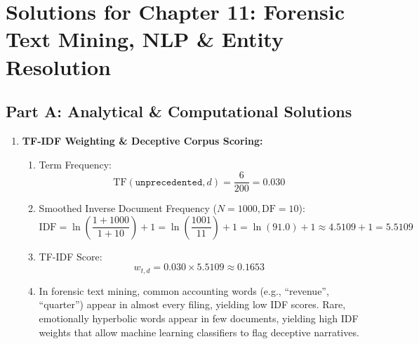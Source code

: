 \section*{Solutions for Chapter 11: Forensic Text Mining, NLP \& Entity Resolution}

\subsection*{Part A: Analytical \& Computational Solutions}

\begin{enumerate}[label=\textbf{P11.\arabic*}]
    \item \textbf{TF-IDF Weighting \& Deceptive Corpus Scoring:}
    \begin{enumerate}[label=(\alph*)]
        \item Term Frequency:
        \begin{equation*}
        \text{TF}(\texttt{unprecedented}, d) = \frac{6}{200} = \mathbf{0.030}
        \end{equation*}
        \item Smoothed Inverse Document Frequency ($N = 1000, \text{DF} = 10$):
        \begin{equation*}
        \text{IDF} = \ln\left(\frac{1 + 1000}{1 + 10}\right) + 1 = \ln\left(\frac{1001}{11}\right) + 1 = \ln(91.0) + 1 \approx 4.5109 + 1 = \mathbf{5.5109}
        \end{equation*}
        \item TF-IDF Score:
        \begin{equation*}
        w_{t,d} = 0.030 \times 5.5109 \approx \mathbf{0.1653}
        \end{equation*}
        \item In forensic text mining, common accounting words (e.g., ``revenue'', ``quarter'') appear in almost every filing, yielding low IDF scores. Rare, emotionally hyperbolic words appear in few documents, yielding high IDF weights that allow machine learning classifiers to flag deceptive narratives.
    \end{enumerate}


\end{enumerate}
